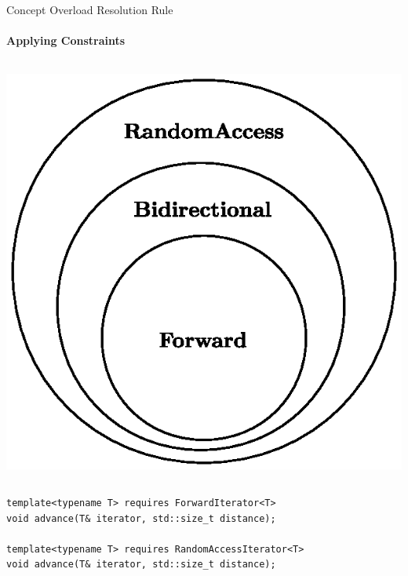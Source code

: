\documentclass{beamer}
\begin{document}
    \begin{frame}[fragile]{Concept Overload Resolution Rule}
        \framesubtitle{Applying Constraints}
        \begin{columns}
            \begin{center}
                \includegraphics[width=\textwidth]{figures/iterators.eps}
            \end{center}
        \end{columns}
        \begin{center}
        \begin{lstlisting}[caption={overload resolution for \texttt{advance} based on type constraint.}]
template<typename T> requires ForwardIterator<T>
void advance(T& iterator, std::size_t distance);

template<typename T> requires RandomAccessIterator<T>
void advance(T& iterator, std::size_t distance); \end{lstlisting}
        \end{center}
    \end{frame}
\end{document}
